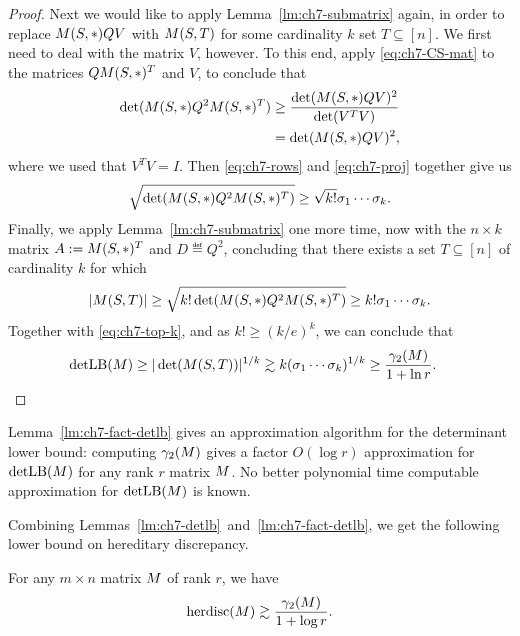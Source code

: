 \begin{proof}
  Next we would like to apply Lemma~\ref{lm:ch7-submatrix} again, in
  order to replace $M(S,*)QV$ with $M(S,T)$ for some cardinality
  $k$ set $T \subseteq [n]$. We first need to deal with the matrix
  $V$, however. To this end, apply \eqref{eq:ch7-CS-mat}  to the
  matrices $QM(S,*)^T$ and $V$, to conclude that
  \begin{align}
    \det(M(S,*)Q^2 M(S,*)^T) &\ge
    \frac{\det(M(S,*)QV)^2}{\det(V^T V)} \notag\\
                                   &= \det(M(S,*)QV)^2,\label{eq:ch7-proj}
  \end{align}
  where we used that $V^T V = I$. 
  Then 
  \eqref{eq:ch7-rows} and \eqref{eq:ch7-proj} together give us
  \[
    \sqrt{\det(M(S,*)Q^2M(S,*)^T)} \ge
    \sqrt{k!} \sigma_1 \cdots \sigma_k.
  \]
  Finally, we apply Lemma~\ref{lm:ch7-submatrix} one more time, now
  with the $n\times k$ matrix $A := M(S,*)^T$ and $D \eqdef
  Q^2$, concluding that there exists a set $T \subseteq [n]$ of
  cardinality $k$ for which
  \[
    |M(S,T)| \ge \sqrt{k!\det(M(S,*)Q^2M(S,*)^T)} \ge
    k! \sigma_1 \cdots \sigma_k.
  \]
  Together with \eqref{eq:ch7-top-k}, and as $k! \ge (k/e)^k$, we can conclude that
  \begin{align*}
    \operatorname{detLB}(M)
    \ge
    |\det(M(S,T))|^{1/k}
    &\gtrsim
      k (\sigma_1 \cdots \sigma_k)^{1/k}
    \ge
      \frac{\gamma_2(M)}{1+\ln r}.  \qedhere
  \end{align*}
\end{proof}

Lemma~\ref{lm:ch7-fact-detlb} gives an approximation algorithm for the
determinant lower bound: computing $\gamma_2(M)$ gives a factor
$O(\log r)$ approximation for $\operatorname{detLB}(M)$ for any rank $r$ matrix
$M$. No better polynomial time computable approximation for
$\operatorname{detLB}(M)$ is known. 

Combining Lemmas~\ref{lm:ch7-detlb}~and~\ref{lm:ch7-fact-detlb}, we get
the following lower bound on hereditary discrepancy.

\begin{theorem}\label{thm:ch7-fact-lb}
  For any $m\times n$ matrix $M$ of rank $r$, we have
  \[
    \operatorname{herdisc}(M) \gtrsim  \frac{\gamma_2(M)}{1 + \log r}.
  \]
\end{theorem}


